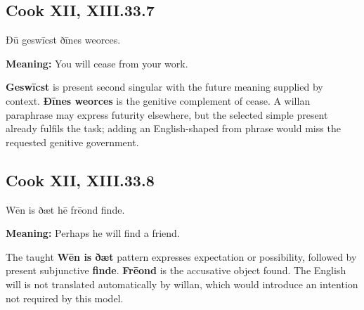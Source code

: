 \par\begin{minipage}{\linewidth}\raggedright
\subsection*{Cook XII, XIII.33.7}

Ðū geswīcst ðīnes weorces.

\textbf{Meaning:} You will cease from your work.

\textbf{Geswīcst} is present second singular with the future meaning supplied by context. \textbf{Ðīnes weorces} is the genitive complement of cease. A willan paraphrase may express futurity elsewhere, but the selected simple present already fulfils the task; adding an English-shaped from phrase would miss the requested genitive government.

\end{minipage}\par\addvspace{4pt}

\par\begin{minipage}{\linewidth}\raggedright
\subsection*{Cook XII, XIII.33.8}

Wēn is ðæt hē frēond finde.

\textbf{Meaning:} Perhaps he will find a friend.

The taught \textbf{Wēn is ðæt} pattern expresses expectation or possibility, followed by present subjunctive \textbf{finde}. \textbf{Frēond} is the accusative object found. The English will is not translated automatically by willan, which would introduce an intention not required by this model.

\end{minipage}\par\addvspace{4pt}

